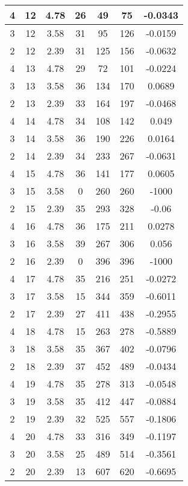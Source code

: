 \documentclass[letterpaper, 12pt]{article}
\begin{document}
\begin{longtable}{|c|c|c|c|c|c|c|}
\hline
4 & 12 & 4.78 & 26 & 49 & 75 & -0.0343 \\
\hline
3 & 12 & 3.58 & 31 & 95 & 126 & -0.0159 \\
\hline
2 & 12 & 2.39 & 31 & 125 & 156 & -0.0632 \\
\hline
4 & 13 & 4.78 & 29 & 72 & 101 & -0.0224 \\
\hline
3 & 13 & 3.58 & 36 & 134 & 170 & 0.0689 \\
\hline
2 & 13 & 2.39 & 33 & 164 & 197 & -0.0468 \\
\hline
4 & 14 & 4.78 & 34 & 108 & 142 & 0.049 \\
\hline
3 & 14 & 3.58 & 36 & 190 & 226 & 0.0164 \\
\hline
2 & 14 & 2.39 & 34 & 233 & 267 & -0.0631 \\
\hline
4 & 15 & 4.78 & 36 & 141 & 177 & 0.0605 \\
\hline
3 & 15 & 3.58 & 0 & 260 & 260 & -1000 \\
\hline
2 & 15 & 2.39 & 35 & 293 & 328 & -0.06 \\
\hline
4 & 16 & 4.78 & 36 & 175 & 211 & 0.0278 \\
\hline
3 & 16 & 3.58 & 39 & 267 & 306 & 0.056 \\
\hline
2 & 16 & 2.39 & 0 & 396 & 396 & -1000 \\
\hline
4 & 17 & 4.78 & 35 & 216 & 251 & -0.0272 \\
\hline
3 & 17 & 3.58 & 15 & 344 & 359 & -0.6011 \\
\hline
2 & 17 & 2.39 & 27 & 411 & 438 & -0.2955 \\
\hline
4 & 18 & 4.78 & 15 & 263 & 278 & -0.5889 \\
\hline
3 & 18 & 3.58 & 35 & 367 & 402 & -0.0796 \\
\hline
2 & 18 & 2.39 & 37 & 452 & 489 & -0.0434 \\
\hline
4 & 19 & 4.78 & 35 & 278 & 313 & -0.0548 \\
\hline
3 & 19 & 3.58 & 35 & 412 & 447 & -0.0884 \\
\hline
2 & 19 & 2.39 & 32 & 525 & 557 & -0.1806 \\
\hline
4 & 20 & 4.78 & 33 & 316 & 349 & -0.1197 \\
\hline
3 & 20 & 3.58 & 25 & 489 & 514 & -0.3561 \\
\hline
2 & 20 & 2.39 & 13 & 607 & 620 & -0.6695 \\
\hline
\end{longtable}
\end{document}
